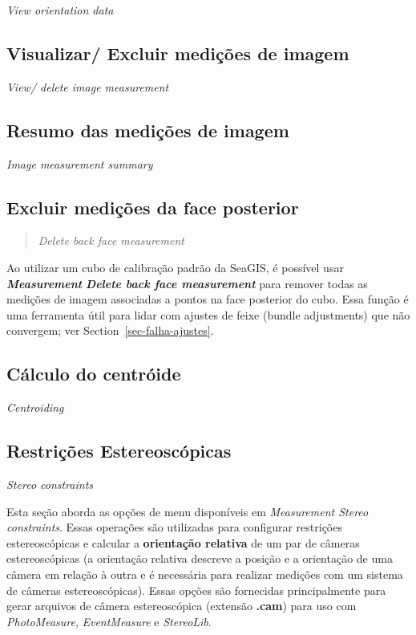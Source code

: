 \documentclass[
  12pt,
  letterpaper,
  DIV=11,
  numbers=noendperiod]{scrreprt}
\begin{document}
\emph{View orientation data}

\subsection{Visualizar/ Excluir medições de
imagem}\label{visualizar-excluir-mediuxe7uxf5es-de-imagem-1}

\emph{View/ delete image measurement}

\subsection{Resumo das medições de
imagem}\label{resumo-das-mediuxe7uxf5es-de-imagem-1}

\emph{Image measurement summary}

\subsection{Excluir medições da face
posterior}\label{excluir-mediuxe7uxf5es-da-face-posterior-1}

\begin{quote}
\emph{Delete back face measurement}
\end{quote}

Ao utilizar um cubo de calibração padrão da SeaGIS, é possível usar
\textbf{\emph{Measurement}} \textbf{\textbar{} \emph{Delete back face
measurement}} para remover todas as medições de imagem associadas a
pontos na face posterior do cubo. Essa função é uma ferramenta útil para
lidar com ajustes de feixe (bundle adjustments) que não convergem; ver
Section~\ref{sec-falha-ajustes}.

\subsection{Cálculo do centróide}\label{cuxe1lculo-do-centruxf3ide-1}

\emph{Centroiding}

\subsection{Restrições
Estereoscópicas}\label{restriuxe7uxf5es-estereoscuxf3picas-1}

\emph{Stereo constraints}

Esta seção aborda as opções de menu disponíveis em \emph{Measurement
\textbar{} Stereo constraints}. Essas operações são utilizadas para
configurar restrições estereoscópicas e calcular a \textbf{orientação
relativa} de um par de câmeras estereoscópicas (a orientação relativa
descreve a posição e a orientação de uma câmera em relação à outra e é
necessária para realizar medições com um sistema de câmeras
estereoscópicas). Essas opções são fornecidas principalmente para gerar
arquivos de câmera estereoscópica (extensão \textbf{.cam}) para uso com
\emph{PhotoMeasure}, \emph{EventMeasure} e \emph{StereoLib}.
\end{document}

